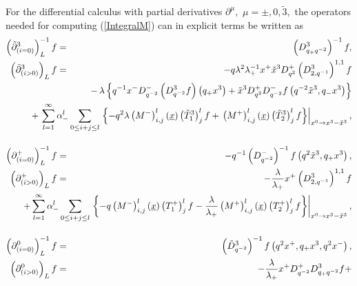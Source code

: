 \documentclass[a4paper,11pt,oneside]{article}
\begin{document}
For the differential calculus with partial derivatives $\partial ^{\mu},$ $\mu=\pm ,0,\tilde{3},$ the operators
needed for computing (\ref{IntegralM}) can in explicit terms be written as 
\begin{eqnarray}
\left( \tilde{\partial}_{\left( i=0\right) }^{3}\right) _{L}^{-1}f &=&\left(
D_{q_{+}q^{-2}}^{3}\right) ^{-1}f,  \label{DerMin1} \\
\left( \tilde{\partial}_{\left( i>0\right) }^{3}\right) _{L}f &=&-q
\lambda ^{2}\lambda_{+}^{-1}x^{+}\tilde{x}^{3}D_{q^{2}}^{+}\left(
D_{2,q^{-1}}^{3}\right) ^{1,1}f  \nonumber \\
&&\hspace{-2cm}-\,\lambda \left\{ q^{-1}x^{-}D_{q^{-2}}^{-}\left(
D_{q^{-2}}^{3}f\right) \left( q_{+}x^{3}\right) +\tilde{x}%
^{3}D_{q^{2}}^{+}D_{q^{-2}}^{-}f\left( q^{-2}\tilde{x}^{3},q_{-}x^{3}\right)
\right\}  \nonumber \\
&&\hspace{-2cm}+\,\sum_{l=1}^{\infty }\alpha _{-}^{l}\sum_{0\leq i+j\leq
l}\left. \left\{ -q^{2}\lambda \left( M^{-}\right) _{i,j}^{l}\left( \underline{x}%
\right)\left(\tilde{T}^3_1\right)^l_jf +\,\left( M^{+}\right) _{i,j}^{l}\left( \underline{x}%
\right)  \left(\tilde{T}^3_2\right)^l_jf\right\}
\right| _{x^{0}\rightarrow x^{3}-\tilde{x}^{3}}
,  \nonumber \\[0.16in]
\left( \partial _{\left( i=0\right) }^{+}\right) _{L}^{-1}f &=&-q^{-1}\left(
D_{q^{-2}}^{-}\right) ^{-1}f\left( q^{2}\tilde{x}^{3},q_{+}x^{3}\right) , \\
\left( \partial _{\left( i>0\right) }^{+}\right) _{L}f &=&-\frac{\lambda }{%
\lambda _{+}}x^{+}\left( D_{2,q^{-1}}^{3}\right) ^{1,1}f  \nonumber \\
&&\hspace{-2cm}+\sum_{l=1}^{\infty }\alpha _{-}^{l}\sum_{0\leq i+j\leq
l}\left.\left\{ -q\left( M^{-}\right) _{i,j}^{l}\left(
  \underline{x}\right)\left(T^+_1\right)^l_jf -\frac{\lambda }{\lambda _{+}}\left( M^{+}\right)
_{i,j}^{l}\left( \underline{x}\right) 
\left(T^+_2\right)^l_jf\right\}\right| _{x^{0}\rightarrow x^{3}-\tilde{x}%
^{3}} ,  \nonumber \\[0.16in]
\left( \partial _{\left( i=0\right) }^{0}\right) _{L}^{-1}f &=&\left( \tilde{%
D}_{q^{-2}}^{3}\right) ^{-1}f\left( q^{2}x^{+},q_{+}x^{3},q^{2}x^{-}\right) ,
\\
\left( \partial _{\left( i>0\right) }^{0}\right) _{L}f &=&-\frac{\lambda}{ \lambda_{+}}x^{+}D_{q^{-2}}^{+}D_{q_{+}q^{-2}}^{3}f+  \nonumber \\

\end{eqnarray}
\end{document}
